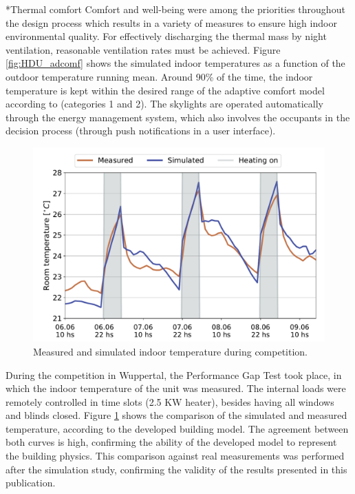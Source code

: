 \documentclass[twocolumn, a4paper,10pt]{article}
\makeatletter
\renewcommand\subsection{\@startsection{subsection}{1}{\z@}{\z@}{\z@}{\normalfont\normalsize\bfseries}}
\renewcommand\subsection{\@startsection{subsection}{1}{\z@}{\z@}{0.1pt}{\normalfont\normalsize\bfseries}}
\makeatother
\begin{document}
\subsection*{Thermal comfort}
Comfort and well-being were among the priorities throughout the design process which results in a variety of measures to ensure high indoor environmental quality. For effectively discharging the thermal mass by night ventilation, reasonable ventilation rates must be achieved. Figure \ref{fig:HDU_adcomf} shows the simulated indoor temperatures as a function of the outdoor temperature running mean. Around 90\% of the time, the indoor temperature is kept within the desired range of the adaptive comfort model according to \citet{DIN16798} (categories 1 and 2). The skylights are operated automatically through the energy management system, which also involves the occupants in the decision process (through push notifications in a user interface).\\ 

\vspace{-5pt} 
\begin{figure}[H]
\centering
\includegraphics[scale=0.34]{img/Mess_PGC.pdf}
\caption{Measured and simulated indoor temperature during competition.}
\label{fig:Mess_PGC}
\end{figure}

During the competition in Wuppertal, the Performance Gap Test took place, in which the indoor temperature of the unit was measured. The internal loads were remotely controlled in time slots (2.5 KW heater), besides having all windows and blinds closed. Figure \ref{fig:Mess_PGC} shows the comparison of the simulated and measured temperature, according to the developed building model. The agreement between both curves is high, confirming the ability of the developed model to represent the building physics. This comparison against real measurements was performed after the simulation study, confirming the validity of the results presented in this publication. \\ 
\end{document}

